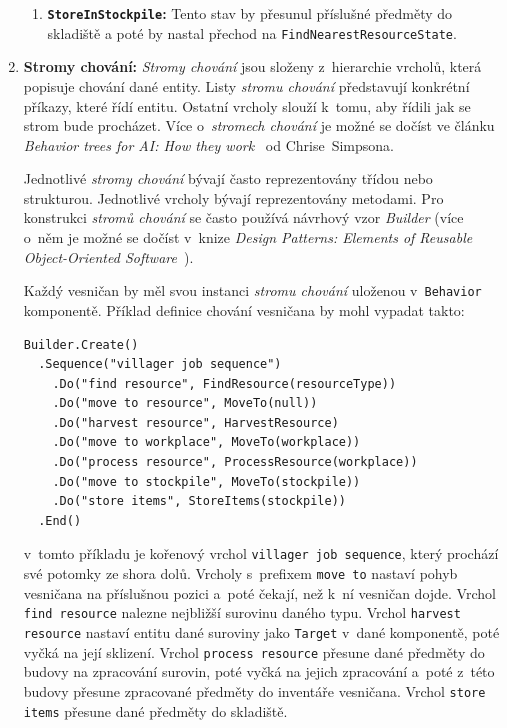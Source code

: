 \begin{enumerate}
\begin{enumerate}
        \item \textbf{\texttt{StoreInStockpile}:} Tento stav by přesunul příslušné předměty do skladiště a poté by nastal přechod na \texttt{FindNearestResourceState}.
    \end{enumerate}

    \item \textbf{Stromy chování:} \textit{Stromy chování} jsou složeny z~hierarchie vrcholů, která popisuje chování dané entity. Listy \textit{stromu chování} představují konkrétní příkazy, které řídí entitu. Ostatní vrcholy slouží k~tomu, aby řídili jak se strom bude procházet. Více o~\textit{stromech chování} je možné se dočíst ve článku \textit{Behavior trees for AI: How they work}~\cite{BehaviorTrees} od Chrise~Simpsona.

    Jednotlivé \textit{stromy chování} bývají často reprezentovány třídou nebo strukturou. Jednotlivé vrcholy bývají reprezentovány metodami. Pro konstrukci \textit{stromů chování} se často používá návrhový vzor \textit{Builder} (více o~něm je možné se dočíst v~knize \textit{Design Patterns: Elements of Reusable Object-Oriented Software}~\cite{gamma1994design}).
    
    Každý vesničan by měl svou instanci \textit{stromu chování} uloženou v~\texttt{Behavior} komponentě. Příklad definice chování vesničana by mohl vypadat takto:

    \begin{verbatim}
Builder.Create()
  .Sequence("villager job sequence")
    .Do("find resource", FindResource(resourceType))
    .Do("move to resource", MoveTo(null))
    .Do("harvest resource", HarvestResource)
    .Do("move to workplace", MoveTo(workplace))
    .Do("process resource", ProcessResource(workplace))
    .Do("move to stockpile", MoveTo(stockpile))
    .Do("store items", StoreItems(stockpile))
  .End()
    \end{verbatim}

    v~tomto příkladu je kořenový vrchol \texttt{villager job sequence}, který prochází své potomky ze shora dolů. Vrcholy s~prefixem \texttt{move to} nastaví pohyb vesničana na příslušnou pozici a~poté čekají, než k~ní vesničan dojde. Vrchol \texttt{find resource} nalezne nejbližší surovinu daného typu. Vrchol \texttt{harvest resource} nastaví entitu dané suroviny jako \texttt{Target} v~dané komponentě, poté vyčká na její sklizení. Vrchol \texttt{process resource} přesune dané předměty do budovy na zpracování surovin, poté vyčká na jejich zpracování a~poté z~této budovy přesune zpracované předměty do inventáře vesničana. Vrchol \texttt{store items} přesune dané předměty do skladiště.
\end{enumerate}

